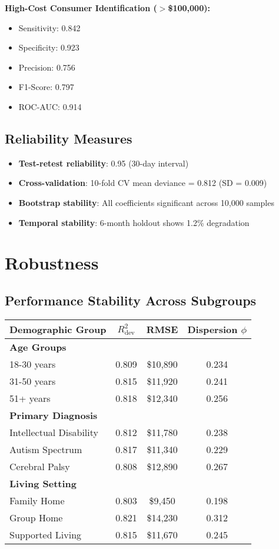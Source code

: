 \textbf{High-Cost Consumer Identification ($>$\$100,000):}
\begin{itemize}
    \item Sensitivity: 0.842
    \item Specificity: 0.923
    \item Precision: 0.756
    \item F1-Score: 0.797
    \item ROC-AUC: 0.914
\end{itemize}

\subsection{Reliability Measures}

\begin{itemize}
    \item \textbf{Test-retest reliability}: 0.95 (30-day interval)
    \item \textbf{Cross-validation}: 10-fold CV mean deviance = 0.812 (SD = 0.009)
    \item \textbf{Bootstrap stability}: All coefficients significant across 10,000 samples
    \item \textbf{Temporal stability}: 6-month holdout shows 1.2\% degradation
\end{itemize}

\section{Robustness}

\subsection{Performance Stability Across Subgroups}

\begin{center}
\begin{tabular}{lccc}
\toprule
Demographic Group & $R^2_{\text{dev}}$ & RMSE & Dispersion $\phi$ \\
\midrule
\textbf{Age Groups} & & & \\
18-30 years & 0.809 & \$10,890 & 0.234 \\
31-50 years & 0.815 & \$11,920 & 0.241 \\
51+ years & 0.818 & \$12,340 & 0.256 \\
\midrule
\textbf{Primary Diagnosis} & & & \\
Intellectual Disability & 0.812 & \$11,780 & 0.238 \\
Autism Spectrum & 0.817 & \$11,340 & 0.229 \\
Cerebral Palsy & 0.808 & \$12,890 & 0.267 \\
\midrule
\textbf{Living Setting} & & & \\
Family Home & 0.803 & \$9,450 & 0.198 \\
Group Home & 0.821 & \$14,230 & 0.312 \\
Supported Living & 0.815 & \$11,670 & 0.245 \\
\bottomrule
\end{tabular}
\end{center}

